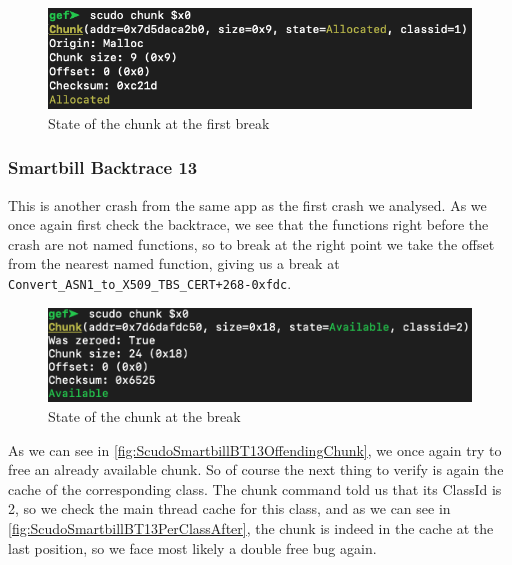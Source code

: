 \documentclass[a4paper,11pt,oneside]{report}
\begin{document}
\begin{figure}[h!]
  \centering
  \includegraphics[width=\linewidth]{figures/ScudoV3MobilePlusChunkBefore.png}
  \caption{State of the chunk at the first break}
  \label{fig:ScudoV3MobilePlusChunkBefore}
\end{figure}

\subsubsection{Smartbill Backtrace 13}

This is another crash from the same app as the first crash we analysed. As we
once again first check the backtrace, we see that the functions right before the
crash are not named functions, so to break at the right point we take the offset
from the nearest named function, giving us a break at \verb|Convert_ASN1_to_X509_TBS_CERT+268-0xfdc|.

\begin{figure}[h!]
  \centering
  \includegraphics[width=\linewidth]{figures/ScudoSmartbillBT13OffendingChunk.png}
  \caption{State of the chunk at the break}
  \label{fig:ScudoSmartbillBT13OffendingChunk}
\end{figure}

As we can see in \autoref{fig:ScudoSmartbillBT13OffendingChunk}, we once again
try to free an already available chunk. So of course the next thing to verify
is again the cache of the corresponding class. The chunk command told us that
its ClassId is 2, so we check the main thread cache for this class, and as we
can see in \autoref{fig:ScudoSmartbillBT13PerClassAfter}, the chunk is indeed
in the cache at the last position, so we face most likely a double free bug
again.
\end{document}
